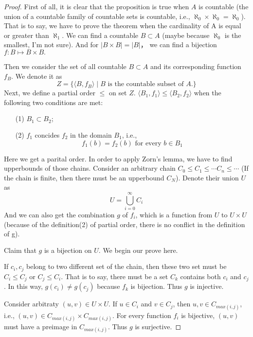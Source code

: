 \documentclass{article}
\begin{document}
    \begin{proof}
    First of all, 
    it is clear that the proposition is true when $A$ is countable
    (the union of a countable family of countable sets is countable, 
    i.e., $\aleph_0 \times \aleph_0 = \aleph_0$). 
    That is to say, we have to prove the theorem when the cardinality of A is equal or greater than $\aleph_1$.
    We can find a countable $B\subset A$ 
    (maybe because $\aleph_0$ is the smallest, I'm not sure).
    And for $|  B\times B|  = |  B| $， 
    we can find a bijection $f: B\mapsto B\times B.$

    Then we consider the set of all countable $B \subset A$ and
    its corresponding function $f_B$. We denote it as
    $$Z = \{ \langle B,f_B\rangle \mid B\text{ is the countable subset of }A.\}$$
    Next, we define a partial order $ \leq $ on set $Z$. 
    $\langle B_1,f_1\rangle  \leq \langle B_2,f_2\rangle $ when the following two conditions are met:
    \begin{enumerate}
        \item[(1)] $B_1 \subset B_2$;
        \item[(2)] $f_1$ concides $f_2$ in the domain $B_1$, i.e., 
        $$f_1(b) = f_2(b) \text{ for every }b\in B_1$$  
        
    \end{enumerate}
    
    Here we get a parital order.
    In order to apply Zorn's lemma, we have to find upperbounds of those chains.
    Consider an arbitrary chain $C_0 \leq C_1 \leq \cdots C_n\leq \cdots$
    (If the chain is finite, then there must be an upperbound $C_N$).
    Denote their union $U$ as 
    $$ U = \bigcup_{i =0}^\infty C_i$$
    And we can also get the combination $g$ of $f_i$, 
    which is a function from $U$ to $U \times U$
     (because of the definition(2) of partial order, there is no conflict in the definition of g).

    Claim that $g$ is a bijection on $U$. 
    We begin our prove here.
        
    If $c_i,c_j$ belong to two different set of the chain, 
        then these two set must be $C_i \leq C_j$ or $C_j \leq C_i$.
        That is to say, there must be a set $C_k$ contains both $c_i$ and $c_j$.
        In this way, $g(c_i) \not= g(c_j)$ because $f_k$ is bijection.
        Thus $g$ is injective.

    Consider arbitraty $(u,v)\in U \times U.$ 
    If $u \in C_i$ and $v\in C_j$, then $u,v \in C_{max(i,j)}$,
     i.e., $(u,v)\in C_{max(i,j)} \times C_{max(i,j)}$. 
    For every function $f_i$ is bijective, $(u,v)$ must have a preimage in $C_{max(i,j)}$.
    Thus $g$ is surjective.


\end{proof}
\end{document}
